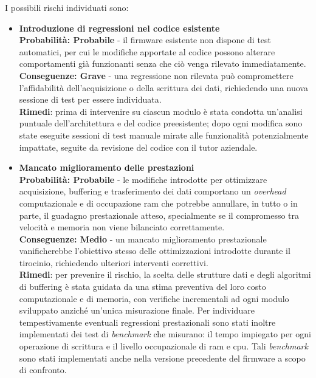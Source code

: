 I possibili rischi individuati sono:

\begin{itemize}

    \item \textbf{Introduzione di regressioni nel codice esistente}\\
    \textbf{Probabilità: Probabile} - il firmware esistente non dispone di test automatici,
    per cui le modifiche apportate al codice possono alterare comportamenti già funzionanti
    senza che ciò venga rilevato immediatamente.\\
    \textbf{Conseguenze: Grave} - una regressione non rilevata può compromettere
    l'affidabilità dell'acquisizione o della scrittura dei dati, richiedendo una nuova
    sessione di test per essere individuata.\\
    \textbf{Rimedi}: prima di intervenire su ciascun modulo è stata condotta un'analisi puntuale
    dell'architettura e del codice preesistente; dopo ogni modifica sono state eseguite sessioni
    di test manuale mirate alle funzionalità potenzialmente impattate, seguite da revisione del
    codice con il tutor aziendale.

    \item \textbf{Mancato miglioramento delle prestazioni}\\
    \textbf{Probabilità: Probabile} - le modifiche introdotte per ottimizzare acquisizione,
    buffering e trasferimento dei dati comportano un \textit{overhead} computazionale e di occupazione
    \gls{ram} che potrebbe annullare, in tutto o in parte, il guadagno prestazionale atteso,
    specialmente se il compromesso tra velocità e memoria non viene bilanciato correttamente.\\
    \textbf{Conseguenze: Medio} - un mancato miglioramento prestazionale vanificherebbe
    l'obiettivo stesso delle ottimizzazioni introdotte durante il tirocinio, richiedendo
    ulteriori interventi correttivi.\\
    \textbf{Rimedi}: per prevenire il rischio, la scelta delle strutture dati e degli algoritmi
    di buffering è stata guidata da una stima preventiva del loro costo computazionale e di
    memoria, con verifiche incrementali ad ogni modulo sviluppato anziché un'unica misurazione
    finale. Per individuare tempestivamente eventuali regressioni prestazionali sono stati inoltre
    implementati dei test di \textit{benchmark} che misurano: il tempo impiegato per ogni
    operazione di scrittura e il livello occupazionale di \gls{ram} e \gls{cpu}. 
    Tali \textit{benchmark} sono stati implementati anche nella versione precedente del firmware 
    a scopo di confronto.


\end{itemize}
